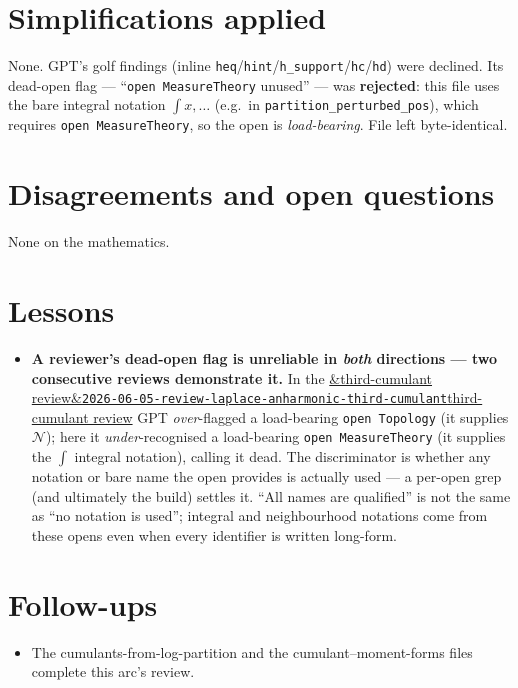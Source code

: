 \documentclass[11pt]{article}
\newcommand{\reviewref}[2][]{\href{https://therisensea.org/reviews/#2/}{\ifx&#1&\texttt{#2}\else#1\fi}}
\begin{document}
\section{Simplifications applied}
None. GPT's golf findings (inline \texttt{heq}/\texttt{hint}/\texttt{h\_support}/\texttt{hc}/\texttt{hd}) were
declined. Its dead-open flag --- ``\texttt{open MeasureTheory} unused'' --- was \textbf{rejected}: this file
uses the bare integral notation $\int x,\ldots$ (e.g.\ in \texttt{partition\_perturbed\_pos}), which requires
\texttt{open MeasureTheory}, so the open is \emph{load-bearing}. File left byte-identical.

\section{Disagreements and open questions}
None on the mathematics.

\section{Lessons}
\begin{itemize}[noitemsep]
  \item \textbf{A reviewer's dead-open flag is unreliable in \emph{both} directions --- two consecutive
    reviews demonstrate it.} In the \reviewref[third-cumulant review]{2026-06-05-review-laplace-anharmonic-third-cumulant}
    GPT \emph{over}-flagged a load-bearing \texttt{open Topology} (it supplies $\mathcal N$); here it
    \emph{under}-recognised a load-bearing \texttt{open MeasureTheory} (it supplies the $\int$ integral
    notation), calling it dead. The discriminator is whether any notation or bare name the open provides is
    actually used --- a per-open grep (and ultimately the build) settles it. ``All names are qualified'' is
    not the same as ``no notation is used''; integral and neighbourhood notations come from these opens even
    when every identifier is written long-form.
\end{itemize}

\section{Follow-ups}
\begin{itemize}[noitemsep]
  \item The cumulants-from-log-partition and the cumulant--moment-forms files complete this arc's review.
\end{itemize}
\end{document}
